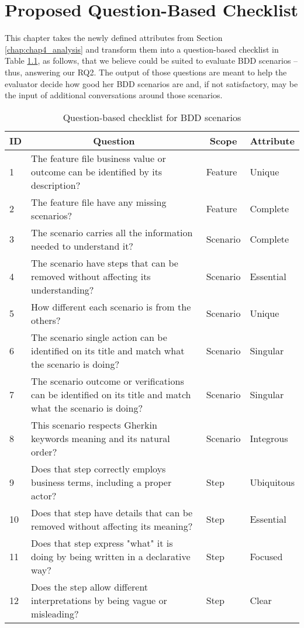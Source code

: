 \chapter{\label{chap:chap5}{Proposed Question-Based Checklist}}

This chapter takes the newly defined attributes from Section \ref{chap:chap4_analysis} and transform them into a question-based checklist in Table \ref{tbl:questionnaire}, as follows, that we believe could be suited to evaluate BDD scenarios -- thus, answering our RQ2. The output of those questions are meant to help the evaluator decide how good her BDD scenarios are and, if not satisfactory, may be the input of additional conversations around those scenarios.

\begin{table}[t]
    \caption{Question-based checklist for BDD scenarios}
    \centering
    \label{tbl:questionnaire}
    \begin{tabular}{|m{0.5cm}|m{10cm}|m{2cm}|m{2cm}|}
        \hline
        \multicolumn{1}{|c|}{\textbf{ID}} & \multicolumn{1}{|c|}{\textbf{Question}} & \multicolumn{1}{|c|}{\textbf{Scope}} & \multicolumn{1}{|c|}{\textbf{Attribute}}\\
        \hline
        1 & The feature file business value or outcome can be identified by its description? & Feature & Unique\\
        \hline
        2 & The feature file have any missing scenarios? & Feature & Complete \\
        \hline
        3 & The scenario carries all the information needed to understand it? & Scenario & Complete\\
        \hline
        4 & The scenario have steps that can be removed without affecting its understanding? & Scenario & Essential\\
        \hline
        5 & How different each scenario is from the others? & Scenario & Unique\\
        \hline
        6 & The scenario single action can be identified on its title and match what the scenario is doing? & Scenario & Singular\\
        \hline
        7 & The scenario outcome or verifications can be identified on its title and match what the scenario is doing? & Scenario & Singular\\
        \hline
        8 & This scenario respects Gherkin keywords meaning and its natural order? & Scenario & Integrous\\
        \hline
        9 & Does that step correctly employs business terms, including a proper actor? & Step & Ubiquitous\\
        \hline
        10 & Does that step have details that can be removed without affecting its meaning? & Step & Essential\\
        \hline
        11 & Does that step express "what" it is doing by being written in a declarative way? & Step & Focused\\
        \hline
        12 & Does the step allow different interpretations by being vague or misleading? & Step & Clear\\
        \hline
    \end{tabular}
\end{table}

